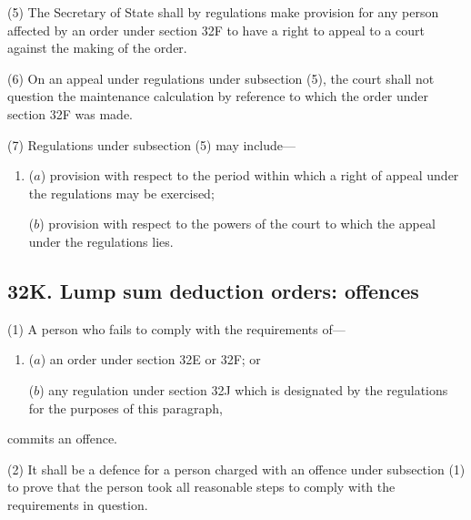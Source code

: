 \documentclass[12pt,a4paper]{article}
\begin{document}
(5)
The Secretary of State shall by regulations make provision for any person affected by an order under section 32F to have a right to appeal to a court against the making of the order.

(6)
On an appeal under regulations under subsection (5), the court shall not question the maintenance calculation by reference to which the order under section 32F was made.

(7)
Regulations under subsection (5) may include---
\begin{enumerate}\item[]
($a$) provision with respect to the period within which a right of appeal under the regulations may be exercised;

($b$) provision with respect to the powers of the court to which the appeal under the regulations lies.
\end{enumerate}


\subsection{32K. Lump sum deduction orders: offences}

(1) A person who fails to comply with the requirements of---
\begin{enumerate}\item[]
($a$) an order under section 32E or 32F; or

($b$) any regulation under section 32J which is designated by the regulations for the purposes of this paragraph,
\end{enumerate}
commits an offence.

(2)
It shall be a defence for a person charged with an offence under subsection (1) to prove that the person took all reasonable steps to comply with the requirements in question.
\end{document}
